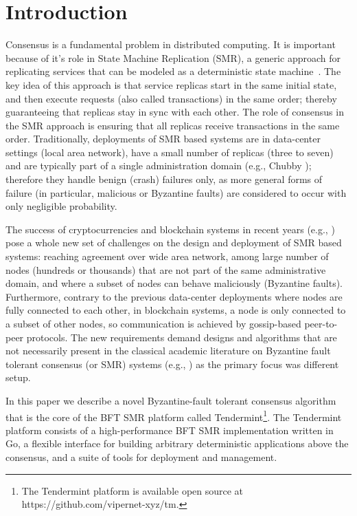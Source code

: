 \section{Introduction} \label{sec:tendermint}

Consensus is a fundamental problem in distributed computing. It
is important because of it's role in State Machine Replication (SMR), a generic
approach for replicating services that can be modeled as a deterministic state
machine~\cite{Lam78:cacm, Sch90:survey}. The key idea of this approach is that
service replicas start in the same initial state, and then execute requests
(also called transactions) in the same order; thereby guaranteeing that
replicas stay in sync with each other. The role of consensus in the SMR
approach is ensuring that all replicas receive transactions in the same order.
Traditionally, deployments of SMR based systems are in data-center settings
(local area network), have a small number of replicas (three to seven) and are
typically part of a single administration domain (e.g., Chubby
\cite{Bur:osdi06}); therefore they handle benign (crash) failures only, as more
general forms of failure (in particular, malicious or Byzantine faults) are
considered to occur with only negligible probability.  

The success of cryptocurrencies and blockchain systems in recent years (e.g.,
\cite{Nak2012:bitcoin, But2014:ethereum}) pose a whole new set of challenges on
the design and deployment of SMR based systems: reaching agreement over wide
area network, among large number of nodes (hundreds or thousands) that are not
part of the same administrative domain, and where a subset of nodes can behave
maliciously (Byzantine faults). Furthermore, contrary to the previous
data-center deployments where nodes are fully connected to each other, in
blockchain systems, a node is only connected to a subset of other nodes, so
communication is achieved by gossip-based peer-to-peer protocols. 
The new requirements demand designs and algorithms that are not necessarily
present in the classical academic literature on Byzantine fault tolerant
consensus (or SMR) systems (e.g., \cite{DLS88:jacm, CL02:tcs}) as the primary 
focus was different setup. 

In this paper we describe a novel Byzantine-fault tolerant consensus algorithm
that is the core of the BFT SMR platform called Tendermint\footnote{The
	Tendermint platform is available open source at
	https://github.com/vipernet-xyz/tm.}. The Tendermint platform consists of
a high-performance BFT SMR implementation written in Go, a flexible interface
for
building arbitrary deterministic applications above the consensus, and a suite
of tools for deployment and management.  

